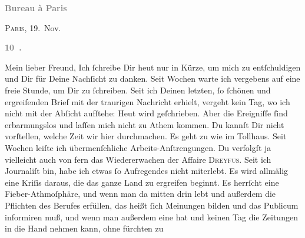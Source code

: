 \pstart
           \begin{otherlanguage}{french}\textcolor{gray}{\textbf{\textbf{Bureau à Paris}}}\end{otherlanguage}\hfill \textsc{Paris}, 19. Nov.\pend
           
\pstart
           \begin{otherlanguage}{french}\textcolor{gray}{\textbf{\textbf{10 .}}}\end{otherlanguage}\pend
           
\pstart\center{}Mein lieber Freund,\pend\vspace{0.5em}
\pstart
           Ich ſchreibe Dir heut nur in Kürze, um mich zu
                  entſchuldigen\strikeout{\textcolor{gray}{.}} und Dir für Deine Nachſicht zu danken. Seit Wochen warte ich vergebens auf
               eine freie Stunde, um \strikeout{\textcolor{gray}{×}\-\textcolor{gray}{×}\-\textcolor{gray}{×}} Dir zu  ſchreiben. Seit ich Deinen letzten, ſo ſchönen und ergreifenden Brief mit der
               traurigen Nachricht erhielt, vergeht kein Tag, wo ich nicht mit der Abſicht aufſtehe:
               Heut wird geſchrieben. Aber die Ereigniſſe ſind erbarmungslos und laſſen mich nicht
               zu Athem kommen.  Du kannſt Dir nicht vorſtellen,
               welche Zeit wir {\pb}hier durchmachen. Es geht zu wie im
               Tollhaus. Seit Wochen leiſte ich übermenſchliche Arbeits-Anſtrengungen. Du verfolgſt
               ja vielleicht auch von fern das Wiedererwachen der Affaire \textsc{Dreyfus}. Seit ich Journaliſt bin, habe ich etwas ſo Aufregendes nicht miterlebt. Es
               wird allmälig eine Kriſis daraus, die das ganze Land zu ergreifen beginnt. Es herrſcht eine Fieber-Athmoſphäre,
               und wenn man da mitten drin lebt und außerdem die Pflichten des Berufes erfüllen, das
               heißt ſich Meinungen bilden und das Publicum informiren muß, und wenn man außerdem
               eine \label{K_L02831-1v}\label{K_L02831-1} hat und keinen Tag die Zeitungen in die Hand nehmen kann, ohne fürchten zu
